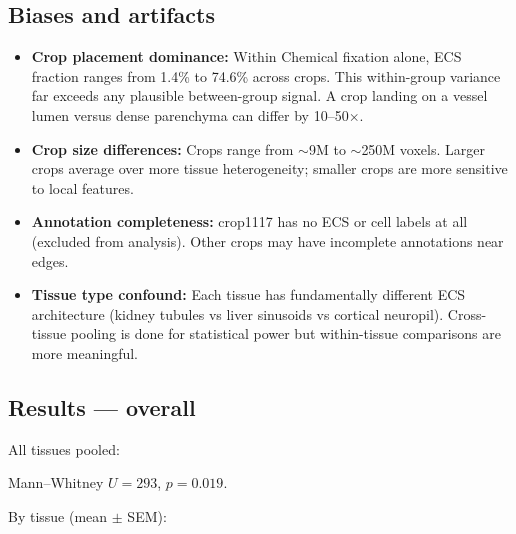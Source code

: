 \documentclass[times, twoside]{zHenriquesLab-StyleBioRxiv}
\begin{document}
\subsection*{Biases and artifacts}
\begin{itemize}[nosep]
\item \textbf{Crop placement dominance:} Within Chemical fixation alone, ECS fraction ranges from 1.4\% to 74.6\% across crops. This within-group variance far exceeds any plausible between-group signal. A crop landing on a vessel lumen versus dense parenchyma can differ by 10--50$\times$.
\item \textbf{Crop size differences:} Crops range from $\sim$9M to $\sim$250M voxels. Larger crops average over more tissue heterogeneity; smaller crops are more sensitive to local features.
\item \textbf{Annotation completeness:} crop1117 has no ECS or cell labels at all (excluded from analysis). Other crops may have incomplete annotations near edges.
\item \textbf{Tissue type confound:} Each tissue has fundamentally different ECS architecture (kidney tubules vs liver sinusoids vs cortical neuropil). Cross-tissue pooling is done for statistical power but within-tissue comparisons are more meaningful.
\end{itemize}

\subsection*{Results --- overall}

All tissues pooled:

\begin{table}[h]
\centering
{}
\end{table}

Mann--Whitney $U = 293$, $p = 0.019$.

By tissue (mean $\pm$ SEM):

\begin{table}[h]
\centering
{}
\end{table}
\end{document}
